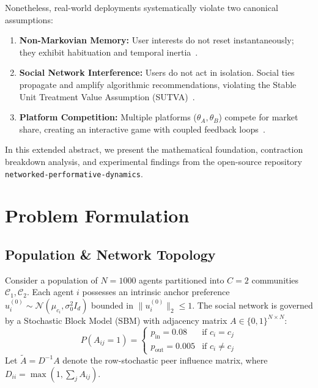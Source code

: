 \documentclass[10pt,twocolumn]{article}
\begin{document}
Nonetheless, real-world deployments systematically violate two canonical assumptions:
\begin{enumerate}[leftmargin=*]
    \setlength{\itemsep}{0pt}
    \item \textbf{Non-Markovian Memory:} User interests do not reset instantaneously; they exhibit habituation and temporal inertia~\cite{miller2021outside}.
    \item \textbf{Social Network Interference:} Users do not act in isolation. Social ties propagate and amplify algorithmic recommendations, violating the Stable Unit Treatment Value Assumption (SUTVA)~\cite{ugander2013graph}.
    \item \textbf{Platform Competition:} Multiple platforms ($\theta_A, \theta_B$) compete for market share, creating an interactive game with coupled feedback loops~\cite{jagadeesan2022competition}.
\end{enumerate}

In this extended abstract, we present the mathematical foundation, contraction breakdown analysis, and experimental findings from the open-source repository \texttt{networked-performative-dynamics}.

\section{Problem Formulation}

\subsection{Population \& Network Topology}
Consider a population of $N = 1000$ agents partitioned into $C = 2$ communities $\mathcal{C}_1, \mathcal{C}_2$. Each agent $i$ possesses an intrinsic anchor preference $u_i^{(0)} \sim \mathcal{N}(\mu_{c_i}, \sigma_0^2 I_d)$ bounded in $\|u_i^{(0)}\|_2 \le 1$. The social network is governed by a Stochastic Block Model (SBM) with adjacency matrix $A \in \{0, 1\}^{N \times N}$:
\begin{equation}
P(A_{ij} = 1) = \begin{cases} 
p_{\text{in}} = 0.08 & \text{if } c_i = c_j \\ 
p_{\text{out}} = 0.005 & \text{if } c_i \neq c_j 
\end{cases}
\end{equation}
Let $\tilde{A} = D^{-1} A$ denote the row-stochastic peer influence matrix, where $D_{ii} = \max(1, \sum_j A_{ij})$.
\end{document}
